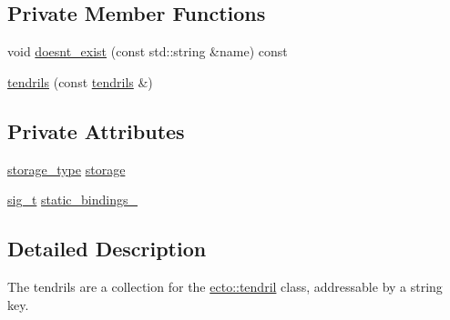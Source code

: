 \subsection*{\-Private \-Member \-Functions}
\begin{DoxyCompactItemize}
\item 
void \hyperlink{classecto_1_1tendrils_aa33d16327157994060a8051d2bbe018e}{doesnt\-\_\-exist} (const std\-::string \&name) const 
\item 
\hyperlink{classecto_1_1tendrils_a7ee52bb996bd2ec581ff2008dea341dc}{tendrils} (const \hyperlink{classecto_1_1tendrils}{tendrils} \&)
\end{DoxyCompactItemize}
\subsection*{\-Private \-Attributes}
\begin{DoxyCompactItemize}
\item 
\hyperlink{classecto_1_1tendrils_a3647503829f1b29de220584d265c63fb}{storage\-\_\-type} \hyperlink{classecto_1_1tendrils_afaa587298937ffa94ccfefc8a97b4edc}{storage}
\item 
\hyperlink{classecto_1_1tendrils_aa898408b75690dffde72989cdeaf03e6}{sig\-\_\-t} \hyperlink{classecto_1_1tendrils_a40635d009ae082dccde9486c1293212e}{static\-\_\-bindings\-\_\-}
\end{DoxyCompactItemize}


\subsection{\-Detailed \-Description}
\-The tendrils are a collection for the \hyperlink{classecto_1_1tendril}{ecto\-::tendril} class, addressable by a string key. 

